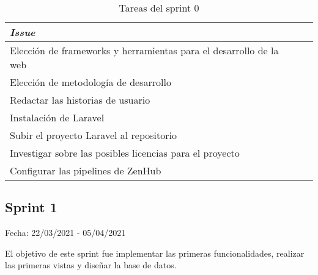 \begin{table}[H]
	 \begin{tabularx}{\linewidth}{X r r}
	 	\toprule \textbf{\textit{Issue}} \\
	 	\toprule
	 	Elección de frameworks y herramientas para el desarrollo de la web  \\
	 	Elección de metodología de desarrollo \\
	 	Redactar las historias de usuario \\
	 	Instalación de Laravel  \\
	 	Subir el proyecto Laravel al repositorio  \\
	 	Investigar sobre las posibles licencias para el proyecto  \\
	 	Configurar las pipelines de ZenHub  \\
	 	\bottomrule
	 \end{tabularx}
	 \caption{Tareas del sprint 0}
\end{table}

\subsection{Sprint 1}

Fecha: 22/03/2021 - 05/04/2021

El objetivo de este sprint fue implementar las primeras funcionalidades, realizar las primeras vistas y diseñar la base de datos.


